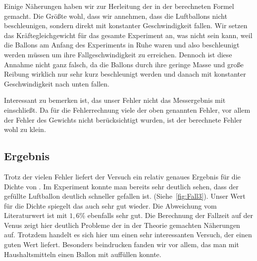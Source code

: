 \documentclass{article}
\begin{document}
          Einige Näherungen haben wir zur Herleitung der in der berechneten Formel gemacht.
          Die Größte wohl, dass wir annehmen, dass die Luftballons nicht beschleunigen, sondern direkt mit konstanter Geschwindigkeit fallen.
          Wir setzen das Kräftegleichgewicht für das gesamte Experiment an, was nicht sein kann,
          weil die Ballons am Anfang des Experiments in Ruhe waren und also beschleunigt werden müssen um ihre Fallgeschwindigkeit zu erreichen.
          Dennoch ist diese Annahme nicht ganz falsch, da die Ballons durch ihre geringe Masse und große Reibung wirklich nur sehr kurz beschleunigt werden und danach mit konstanter Geschwindigkeit nach unten fallen.

          Interessant zu bemerken ist, das unser Fehler nicht das Messergebnis mit einschließt.
          Da für die Fehlerrechnung viele der oben genannten Fehler, vor allem der Fehler des Gewichts nicht berücksichtigt wurden,
          ist der berechnete Fehler wohl zu klein.

      \subsection{Ergebnis}
          Trotz der vielen Fehler liefert der Versuch ein relativ genaues Ergebnis für die Dichte von .
          Im Experiment konnte man bereits sehr deutlich sehen, dass der  gefüllte Luftballon deutlich schneller gefallen ist. (Siehe~\ref{fig:Fall3}).
          Unser Wert für die Dichte spiegelt das auch sehr gut wieder. Die Abweichung vom Literaturwert ist mit \(1,6 \% \) ebenfalls sehr gut.
          Die Berechnung der Fallzeit auf der Venus zeigt hier deutlich Probleme der in der Theorie gemachten Näherungen auf.
          Trotzdem handelt es sich hier um einen sehr interessanten Versuch, der einen guten Wert liefert.
          Besonders beindrucken fanden wir vor allem, das man mit Haushaltsmitteln einen Ballon mit  auffüllen konnte.

      
      \printbibliography[title={Quellen}]
\end{document}
